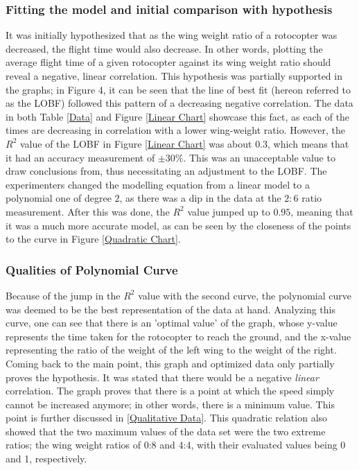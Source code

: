 \documentclass[]{article}
\theoremstyle{definition}
\begin{document}
\subsubsection{Fitting the model and initial comparison with hypothesis}
It was initially hypothesized that as the wing weight ratio of a rotocopter was decreased, the flight time would also decrease. In other words, plotting the average flight time of a given rotocopter against its wing weight ratio should reveal a negative, linear correlation. This hypothesis was partially supported in the graphs; in Figure 4, it can be seen that the line of best fit (hereon referred to as the LOBF) followed this pattern of a decreasing negative correlation. The data in both Table \ref{Data} and Figure \ref{Linear Chart} showcase this fact, as each of the times are decreasing in correlation with a lower wing-weight ratio. However, the $R^2$ value of the LOBF in Figure \ref{Linear Chart} was about $0.3$, which means that it had an accuracy measurement of $\pm 30\%$. This was an unacceptable value to draw conclusions from, thus necessitating an adjustment to the LOBF. The experimenters changed the modelling equation from a linear model to a polynomial one of degree $2$, as there was a dip in the data at the $2:6$ ratio measurement. After this was done, the $R^2$ value jumped up to $0.95$, meaning that it was a much more accurate model, as can be seen by the closeness of the points to the curve in Figure \ref{Quadratic Chart}.

\subsubsection{Qualities of Polynomial Curve}
Because of the jump in the $R^2$ value with the second curve, the polynomial curve was deemed to be the best representation of the data at hand. Analyzing this curve, one can see that there is an 'optimal value' of the graph, whose y-value represents the time taken for the rotocopter to reach the ground, and the x-value representing the ratio of the weight of the left wing to the weight of the right. Coming back to the main point, this graph and optimized data only partially proves the hypothesis. It was stated that there would be a negative \textit{linear} correlation. The graph proves that there is a point at which the speed simply cannot be increased anymore; in other words, there is a minimum value. This point is further discussed in \ref{Qualitative Data}. This quadratic relation also showed that the two maximum values of the data set were the two extreme ratios; the wing weight ratios of 0:8 and 4:4, with their evaluated values being 0 and 1, respectively.
\end{document}
